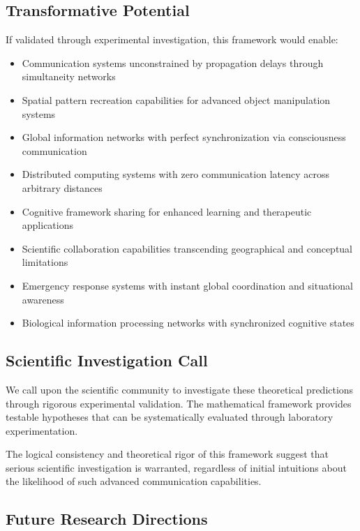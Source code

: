 \documentclass[12pt,a4paper]{article}
\begin{document}
\subsection{Transformative Potential}

If validated through experimental investigation, this framework would enable:

\begin{itemize}
\item Communication systems unconstrained by propagation delays through simultaneity networks
\item Spatial pattern recreation capabilities for advanced object manipulation systems
\item Global information networks with perfect synchronization via consciousness communication
\item Distributed computing systems with zero communication latency across arbitrary distances
\item Cognitive framework sharing for enhanced learning and therapeutic applications
\item Scientific collaboration capabilities transcending geographical and conceptual limitations
\item Emergency response systems with instant global coordination and situational awareness
\item Biological information processing networks with synchronized cognitive states
\end{itemize}

\subsection{Scientific Investigation Call}

We call upon the scientific community to investigate these theoretical predictions through rigorous experimental validation. The mathematical framework provides testable hypotheses that can be systematically evaluated through laboratory experimentation.

The logical consistency and theoretical rigor of this framework suggest that serious scientific investigation is warranted, regardless of initial intuitions about the likelihood of such advanced communication capabilities.

\subsection{Future Research Directions}
\end{document}
